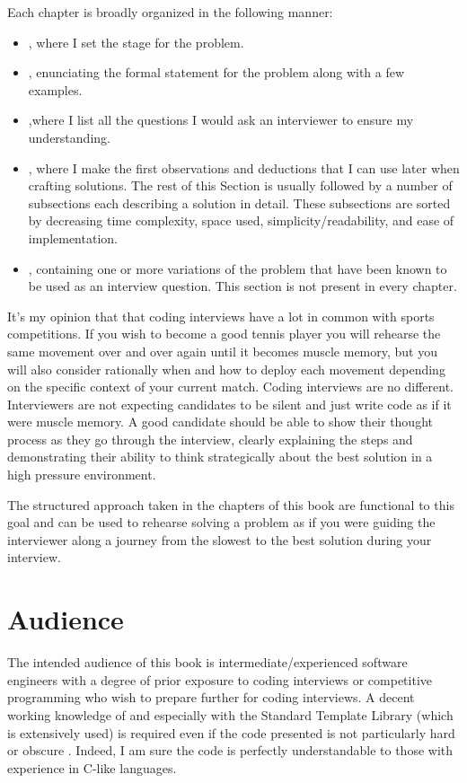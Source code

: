 Each chapter is broadly organized in the following manner: 
\begin{itemize}
    \item \textit{}, where I set the stage for the problem.
    \item \textit{}, enunciating the formal statement for the problem along with a few examples.
    \item \textit{},where I list all the questions I would ask an interviewer to ensure my understanding. 
    \item \textit{}, where I make the first observations and deductions that I can use later when crafting solutions. The rest of this Section is usually followed by a number of subsections each describing a solution in detail. These subsections are sorted by decreasing time complexity, space used, simplicity/readability, and ease of implementation. 
    \item \textit{}, containing one or more variations of the problem that have been known to be used as an interview question. This section is not present in every chapter.
 \end{itemize}

It’s my opinion that  that coding interviews have a lot in common with sports competitions.  If you wish to become a good tennis player you will  rehearse the same movement over and over again until it becomes muscle memory,  but you will also consider rationally when and how to deploy each movement depending on the specific context of your current match. Coding interviews are no different. 
Interviewers are not expecting candidates to be silent and just write code as if it were muscle memory.  
A good candidate should be able to show their thought process as they go through the interview, clearly explaining the steps and demonstrating their ability to think strategically about the best solution in a high pressure environment. 

The structured approach taken in the chapters of this book are functional to this goal and can be used to rehearse solving a problem as if you were guiding the interviewer along a journey from the slowest to the best solution during your interview. 


\section*{Audience}
The intended audience of this book is intermediate/experienced software engineers with a degree of prior exposure to coding interviews or competitive programming who wish to prepare further for coding interviews.
A decent working knowledge of \CC and especially with the Standard Template Library (which is extensively used) is required even if the code presented is not particularly hard or obscure \CC. Indeed, I am sure the code is perfectly understandable to those  with experience in C-like languages. 

